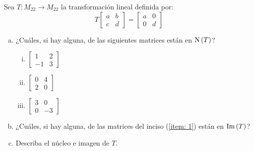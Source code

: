 \begin{exercise}
	Sea $T:M_{22}\to M_{22}$ la transformación lineal definida por:
	\[ 
		T 
		\begin{bmatrix}
			a & b\\
			c & d
		\end{bmatrix}
		=
		\begin{bmatrix}
			a & 0\\
			0 & d
		\end{bmatrix}
	\]
	\begin{enumerate}[a)]
		\item ¿Cuáles, si hay alguna, de las siguientes matrices están en $\mnuc{T}$?
		\begin{enumerate}[i)]
			\item $\begin{bmatrix}
				1 & 2\\
				-1 & 3
			\end{bmatrix}$
			\label{item: m1}
			\item $\begin{bmatrix}
				0 & 4\\
				2 & 0
			\end{bmatrix}$
			\label{item: m2}
			\item $\begin{bmatrix}
				3 & 0\\
				0 & -3
			\end{bmatrix}$
			\label{item: m3}
		\end{enumerate}
		\label{item: 1}
		\item ¿Cuáles, si hay alguna, de las matrices del inciso (\ref{item: 1}) están en $\mim{T}$?
		\item Describa el núcleo e imagen de $T$.
	\end{enumerate}
\end{exercise}
